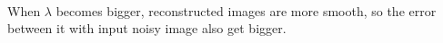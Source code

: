 \documentclass[11pt]{article}
\begin{document}
    \begin{center}
    \end{center}
    { \hspace*{\fill} \\}
    
    When \(\lambda\) becomes bigger, reconstructed images are more smooth,
so the error between it with input noisy image also get bigger.


    
    
    
    
\end{document}
